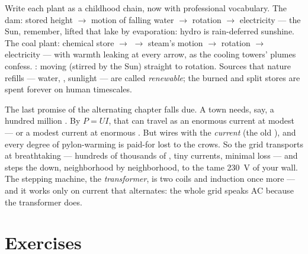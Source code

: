 \begin{example}\label{ex:g9:alternator:chains}
Write each plant as a childhood  chain, now with
professional vocabulary. The dam: stored height $\to$ motion
of falling water $\to$ rotation $\to$ electricity --- the
Sun, remember, lifted that lake by evaporation: hydro 
is rain-deferred sunshine. The coal plant: chemical store
$\to$  $\to$ steam's motion $\to$ rotation $\to$
electricity --- with warmth leaking at every arrow, as the
cooling towers' plumes confess. : moving  (stirred by
the Sun) straight to rotation. Sources that nature refills
--- water, , sunlight --- are called
\emph{renewable}; the burned and split
stores are spent forever on human timescales.
\end{example}

\begin{remark}\label{rem:g9:alternator:transport}
The last promise of the alternating chapter falls due. A
town needs, say, a hundred million . By $P = U I$, that
 can travel as an enormous current at modest 
--- or a modest current at enormous . But wires 
with the \emph{current} (the old ), and every
degree of pylon-warming is paid-for  lost to the
crows. So the grid transports at breathtaking  ---
hundreds of thousands of , tiny currents, minimal loss
--- and steps the  down, neighborhood by
neighborhood, to the tame \qty{230}{V} of your wall. The
stepping machine, the \emph{transformer}, is two coils and
induction once more --- and it works only on current that
alternates: the whole grid speaks AC because the
transformer does.
\end{remark}

\section{Exercises}

